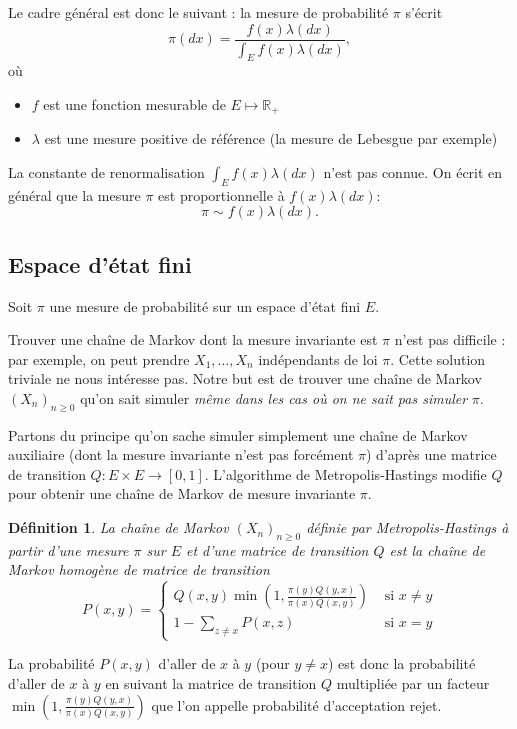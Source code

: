 \documentclass[a4paper,12pt]{book}
\newtheorem{defnfr}[thmfr]{Définition}
\newcommand{\R}{\mathbb{R}}
\begin{document}
Le cadre général est donc le suivant :  la mesure de probabilité $\pi$ s'écrit
$$\pi(dx)=\frac{f(x)\lambda(dx)}{\int_E f(x) \lambda(dx)},
$$
où \begin{itemize}
\item $f$ est une fonction mesurable de $E\mapsto \R_+$
\item $\lambda$ est une mesure positive de référence (la mesure de Lebesgue par exemple)
\end{itemize}
La constante de renormalisation ${\int_E f(x) \lambda(dx)}$ n'est pas connue. On écrit en général que la mesure $\pi$ est proportionnelle à $f(x)\lambda(dx)$:
$$\pi\sim f(x)\lambda(dx).$$


\subsection{Espace d'état fini}
Soit $\pi$ une mesure de probabilité sur un espace d'état fini $E$.

Trouver une chaîne de Markov dont la mesure invariante est $\pi$ n'est pas difficile : par exemple, on peut prendre $X_1,\ldots,X_n$ indépendants de loi $\pi$. Cette solution triviale ne nous intéresse pas. Notre but est de trouver une chaîne de Markov $(X_n)_{n\geq 0}$ qu'on sait simuler \emph{même dans les cas où on ne sait pas simuler} $\pi$.

Partons du principe qu'on sache simuler simplement une chaîne de Markov auxiliaire (dont la mesure invariante n'est pas forcément $\pi$) d'après une matrice de transition $Q:E\times E \to [0,1]$. L'algorithme de Metropolis-Hastings modifie $Q$ pour obtenir une chaîne de Markov de mesure invariante $\pi$.

\begin{defnfr}La chaîne de Markov $(X_n)_{n\geq 0}$ définie par Metropolis-Hastings à partir d'une mesure $\pi$ sur $E$ et d'une matrice de transition $Q$ est la chaîne de Markov homogène de matrice de transition
$$P(x,y)=\left\lbrace\begin{array}{cc}
Q(x,y) \min\left(1,\frac{\pi(y)Q(y,x)}{\pi(x)Q(x,y)}\right) & \text{ si }x\neq y \\
1-\sum_{z\neq x}P(x,z) & \text{ si }x= y
\end{array} \right. $$
\end{defnfr}


La probabilité $P(x,y)$ d'aller de $x$ à $y$ (pour $y\neq x$) est donc la probabilité d'aller de $x$ à $y$ en suivant la matrice de transition $Q$ multipliée par un facteur $\min\left(1,\frac{\pi(y)Q(y,x)}{\pi(x)Q(x,y)}\right)$ que l'on appelle probabilité d'acceptation rejet.
\end{document}
